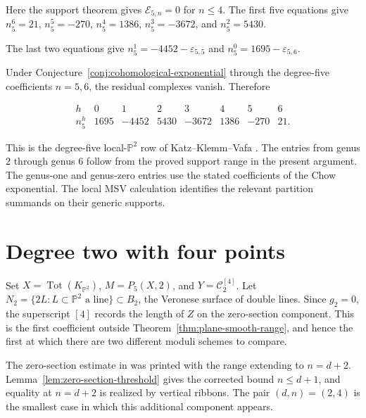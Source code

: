 \documentclass[11pt,reqno]{amsart}
\theoremstyle{definition}
\newcommand{\Pp}{\mathbb P}
\newcommand{\Tot}{\operatorname{Tot}}
\begin{document}
Here the support theorem gives $\mathcal E_{5,n}=0$ for $n\le4$.  The first five
equations give $n_5^6=21$, $n_5^5=-270$, $n_5^4=1386$,
$n_5^3=-3672$, and $n_5^2=5430$.

The last two equations give
$n_5^1=-4452-\varepsilon_{5,5}$ and
$n_5^0=1695-\varepsilon_{5,6}$.

Under Conjecture~\ref{conj:cohomological-exponential} through the degree-five
coefficients $n=5,6$, the residual complexes vanish.  Therefore

\begin{equation}\label{eq:quintic-final-row}
\boxed{
\begin{array}{c|rrrrrrr}
h&0&1&2&3&4&5&6\\ \hline
n_5^h&1695&-4452&5430&-3672&1386&-270&21.
\end{array}}
\end{equation}

This is the degree-five local-$\Pp^2$ row of Katz--Klemm--Vafa
\cite{KKV}.  The entries from genus $2$ through genus $6$ follow from the
proved support range
in the present argument.  The genus-one and genus-zero entries use the stated
coefficients of the Chow exponential.  The local MSV calculation identifies
the relevant partition summands on their generic supports.

\section{Degree two with four points}
\label{sec:degree-two-correction}

Set $X=\Tot(K_{\Pp^2})$, $M=P_5(X,2)$, and
$Y=\mathcal C_2^{[4]}$.  Let
$N_2=\{2L:L\subset\Pp^2\text{ a line}\}\subset B_2$, the Veronese surface
of double lines.  Since $g_2=0$, the superscript $[4]$ records the length of
$Z$ on the zero-section component.  This is the first coefficient outside
Theorem~\ref{thm:plane-smooth-range}, and hence the first at which there are
two different moduli schemes to compare.

The zero-section estimate in \cite[Proposition~2]{CKK} was printed with the
range extending to $n=d+2$.  Lemma~\ref{lem:zero-section-threshold} gives
the corrected bound $n\le d+1$, and equality at $n=d+2$ is realized by
vertical ribbons.  The pair $(d,n)=(2,4)$ is the smallest case in which this
additional component appears.
\end{document}
